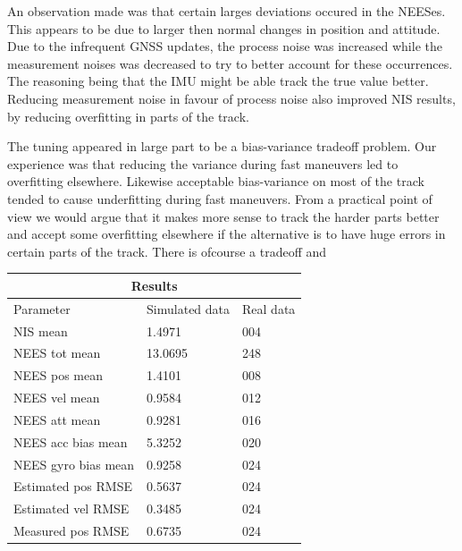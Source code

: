 An observation made was that certain larges deviations occured in the NEESes. 
This appears to be due to larger then normal changes in position and attitude. 
Due to the infrequent GNSS updates, the process noise was increased while
the measurement noises was decreased to try to better account for these occurrences.
The reasoning being that the IMU might be able track the true value better.
Reducing measurement noise in favour of process noise also improved NIS results, 
by reducing overfitting in parts of the track. 

The tuning appeared in large part to be a bias-variance tradeoff problem.
Our experience was that reducing the variance during fast maneuvers led to overfitting elsewhere.
Likewise acceptable bias-variance on most of the track tended to cause underfitting during fast maneuvers.
From a practical point of view we would argue that it makes more sense to track the harder parts better
and accept some overfitting elsewhere if the alternative is to have huge errors in certain parts of the track.
There is ofcourse a tradeoff and 

\begin{tabular}{ |p{5cm}||p{3cm}|p{3cm}|  }
	\hline
	\multicolumn{3}{|c|}{Results} \\
	\hline
	Parameter & Simulated data & Real data\\
	\hline
	NIS mean				& 1.4971  	&   004\\
	NEES tot mean			& 13.0695 	&	248\\
	NEES pos mean 			& 1.4101 	&  008\\
	NEES vel mean			& 0.9584 	& 012\\
	NEES att mean			& 0.9281 	& 016\\
	NEES acc bias mean		& 5.3252 	& 020\\
	NEES gyro bias mean 	& 0.9258 	& 024\\
	Estimated pos RMSE		& 0.5637 	& 024\\
	Estimated vel RMSE		& 0.3485 	& 024\\
	Measured pos RMSE		& 0.6735 	& 024\\
	\hline
   \end{tabular}


